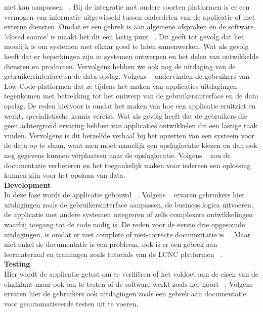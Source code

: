 niet kan aanpassen ~\autocite{Rokis_2022}. Bij de integratie met andere soorten platformen is er een vermogen van informatie uitgewisseld tussen onderdelen van de applicatie 
of met externe diensten. Omdat er een gebrek is aan algemene afspraken en de software 'closed source' is maakt het dit een lastig punt ~\autocite{Rokis_2022}.
 Dit geeft tot gevolg dat het moeilijk is om systemen met elkaar goed te laten samenwerken. 
 Wat als gevolg heeft dat er beperkingen zijn in systemen ontwerpen en het delen van ontwikkelde diensten en producten. 
 Vervolgens hebben we ook nog de uitdaging van de gebruikersinterface en de data opslag. Volgens ~\textcite{Rokis_2022} 
 ondervinden de gebruikers van Low-Code platformen dat ze tijdens het maken van applicaties uitdagingen tegenkomen met betrekking tot het ontwerp 
 van de gebruikersinterface en de data opslag. De reden hiervoor is omdat het maken van hoe een applicatie eruitziet en werkt, specialistische kennis vereist. 
 Wat als gevolg heeft dat de gebruikers die geen achtergrond ervaring hebben van applicaties ontwikkelen dit een lastige taak vinden. 
 Vervolgens is dit hetzelfde verhaal bij het opzetten van een systeem voor de data op te slaan, want men moet namelijk een opslaglocatie kiezen en dan ook nog gegevens 
 kunnen verplaatsen naar de opslaglocatie. Volgens ~\textcite{Rokis_2022} zou de documentatie verbeteren en het toegankelijk maken voor iedereen 
 een oplossing kunnen zijn voor het opslaan van data.
\\
\textbf{Development}
\\
In deze fase wordt de applicatie gebouwd ~\autocite{Ghumatkar_2023}. 
Volgens ~\textcite{Rokis_2022} ervaren gebruikers hier uitdagingen zoals de gebruikersinterface aanpassen, de business logica uitvoeren, de applicatie met andere systemen integreren of zelfs complexere ontwikkelingen waarbij toegang tot de code nodig is. 
De reden voor de eerste drie opgesomde uitdagingen, is omdat er niet complete of niet-correcte documentatie is ~\autocite{Rokis_2022}. 
Maar niet enkel de documentatie is een probleem, ook is er een gebrek aan leermateriaal en trainingen zoals tutorials van de LCNC platformen ~\autocite{Rokis_2022}.
\\
\textbf{Testing}
\\
Hier wordt de applicatie getest om te verifiëren of het voldoet aan de eisen van de eindklant maar ook om te testen of de software werkt zoals het hoort ~\autocite{Ghumatkar_2023}. 
Volgens ~\textcite{Rokis_2022} ervaren hier de gebruikers ook uitdagingen zoals een gebrek aan documentatie voor geautomatiseerde testen uit te voeren, 
